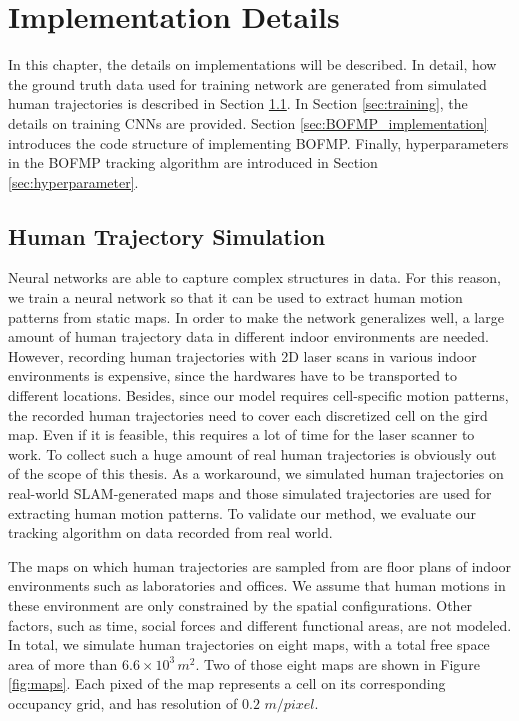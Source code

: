 
\chapter{Implementation Details} \label{chapter:4}

In this chapter, the details on implementations will be described. In detail, how the ground truth data used for training network are generated from simulated human trajectories is described in Section \ref{sec:traj_sim}. In Section \ref{sec:training}, the details on training CNNs are provided. Section \ref{sec:BOFMP_implementation} introduces the code structure of implementing BOFMP. Finally, hyperparameters in the BOFMP tracking algorithm are introduced in Section \ref{sec:hyperparameter}.

\section{Human Trajectory Simulation} \label{sec:traj_sim}

Neural networks are able to capture complex structures in data. For this reason, we train a neural network so that it can be used to extract human motion patterns from static maps. In order to make the network generalizes well, a large amount of human trajectory data in different indoor environments are needed. However, recording human trajectories with 2D laser scans in various indoor environments is expensive, since the hardwares have to be transported to different locations. Besides, since our model requires cell-specific motion patterns, the recorded human trajectories need to cover each discretized cell on the gird map. Even if it is feasible, this requires a lot of time for the laser scanner to work. To collect such a huge amount of real human trajectories is obviously out of the scope of this thesis. As a workaround, we simulated human trajectories on real-world SLAM-generated maps and those simulated trajectories are used for extracting human motion patterns. To validate our method, we evaluate our tracking algorithm on data recorded from real world. 

The maps on which human trajectories are sampled from are floor plans of indoor environments such as laboratories and offices. We assume that human motions in these environment are only constrained by the spatial configurations. Other factors, such as time, social forces and different functional areas, are not modeled. In total, we simulate human trajectories on eight maps, with a total free space area of more than \( 6.6\times10^3 \, m^2 \). Two of those eight maps are shown in Figure \ref{fig:maps}. Each pixed of the map represents a cell on its corresponding occupancy grid, and has resolution of $0.2$ $m/pixel$.

